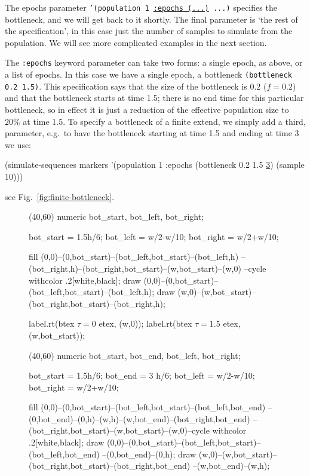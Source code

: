 \documentclass{manual}
\begin{document}
\begin{empfile}
The epochs parameter \texttt{'(population 1 \underline{:epochs (...)}
  ...)} specifies the bottleneck, and we will get back to it shortly.
The final parameter is `the rest of the specification', in this case
just the number of samples to simulate from the population.  We will
see more complicated examples in the next section.

The \texttt{:epochs} keyword parameter can take two forms: a single
epoch, as above, or a list of epochs.  In this case we have a single
epoch, a bottleneck \texttt{(bottleneck 0.2 1.5)}.  This specification
says that the size of the bottleneck is 0.2 ($f=0.2$) and that the
bottleneck starts at time 1.5; there is no end time for this
particular bottleneck, so in effect it is just a reduction of the
effective population size to $20\%$ at time 1.5.  To specify a
bottleneck of a finite extend, we simply add a third, parameter, e.g.\
to have the bottleneck starting at time 1.5 and ending at time 3 we
use:
\begin{code}
(simulate-sequences markers
     '(population 1 :epochs (bottleneck 0.2 1.5 \underline{3}) (sample 10)))
\end{code}
see Fig.~\ref{fig:finite-bottleneck}.

\begin{figure}[t]
  \begin{empdef}(40,60)
    numeric bot_start, bot_left, bot_right;
  
    bot_start = 1.5h/6;
    bot_left  = w/2-w/10;
    bot_right = w/2+w/10;
  
    fill (0,0)--(0,bot_start)--(bot_left,bot_start)--(bot_left,h)
         --(bot_right,h)--(bot_right,bot_start)--(w,bot_start)--(w,0)
         --cycle withcolor .2[white,black];
    draw (0,0)--(0,bot_start)--(bot_left,bot_start)--(bot_left,h);
    draw (w,0)--(w,bot_start)--(bot_right,bot_start)--(bot_right,h);
  
    label.rt(btex $\tau=0$ etex,   (w,0));
    label.rt(btex $\tau=1.5$ etex, (w,bot_start));
  \end{empdef}
  \begin{empdef}(40,60)
    numeric bot_start, bot_end, bot_left, bot_right;

    bot_start = 1.5h/6;
    bot_end   = 3  h/6;
    bot_left  = w/2-w/10;
    bot_right = w/2+w/10;
  
    fill (0,0)--(0,bot_start)--(bot_left,bot_start)--(bot_left,bot_end)
         --(0,bot_end)--(0,h)--(w,h)--(w,bot_end)--(bot_right,bot_end)
         --(bot_right,bot_start)--(w,bot_start)--(w,0)--cycle
         withcolor .2[white,black];
    draw (0,0)--(0,bot_start)--(bot_left,bot_start)--(bot_left,bot_end)
         --(0,bot_end)--(0,h);
    draw (w,0)--(w,bot_start)--(bot_right,bot_start)--(bot_right,bot_end)
         --(w,bot_end)--(w,h);
  

\end{empdef}
\end{figure}
\end{empfile}
\end{document}
